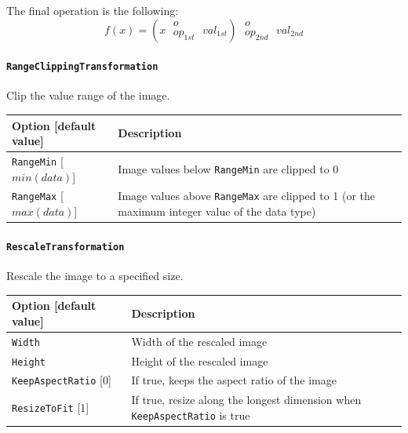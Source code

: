 \documentclass[a4paper,11pt,oneside]{article}
\newcommand{\iponly}{\reversemarginpar
    \marginnote{\color{listletiblue}\normalfont\scriptsize
    {\ttfamily{}\hyperref[sec:N2D2-IP]{\color{listletiblue}N2D2 IP}} \emph{only}}}
\begin{document}
The final operation is the following:
\[f(x) = \left(x\;\substack{o\\op_{1st}}\;val_{1st}\right)\;
\substack{o\\op_{2nd}}\;val_{2nd}\]

\paragraph{\texorpdfstring{\lstinline[basicstyle=\ttfamily\bfseries]!RangeClippingTransformation!\protect\iponly}
{RangeClippingTransformation}}
Clip the value range of the image.

\begin{center}
 \begin{tabular}{| p{5cm} | p{10cm} | }
 \hline
 Option [default value] & Description\\
 \hline\hline
  \lstinline!RangeMin! [$min(data)$] & Image values below \lstinline!RangeMin!
  are clipped to 0 \\
  \lstinline!RangeMax! [$max(data)$] & Image values above \lstinline!RangeMax!
   are clipped to 1 (or the maximum integer value of the data type) \\
 \hline
\end{tabular}
\end{center}

\paragraph{\texorpdfstring{%
\lstinline[basicstyle=\ttfamily\bfseries]!RescaleTransformation!}
{RescaleTransformation}}
Rescale the image to a specified size.

\begin{center}
 \begin{tabular}{| p{5cm} | p{10cm} | }
 \hline
 Option [default value] & Description\\
 \hline\hline
  \cellcolor{requiredcolor}\lstinline!Width! & Width of the rescaled image \\
  \cellcolor{requiredcolor}\lstinline!Height! & Height of the rescaled image \\
  \lstinline!KeepAspectRatio! [0] & If true, keeps the aspect ratio of the
  image \\
  \lstinline!ResizeToFit! [1] & If true, resize along the longest dimension
  when \lstinline!KeepAspectRatio! is true \\
 \hline
\end{tabular}
\end{center}
\end{document}
